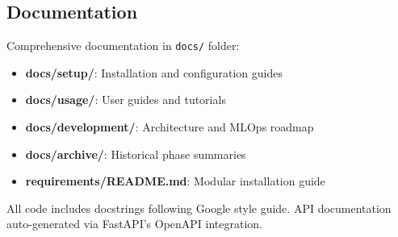 \subsection{Documentation}

Comprehensive documentation in \texttt{docs/} folder:

\begin{itemize}
    \item \textbf{docs/setup/}: Installation and configuration guides
    \item \textbf{docs/usage/}: User guides and tutorials
    \item \textbf{docs/development/}: Architecture and MLOps roadmap
    \item \textbf{docs/archive/}: Historical phase summaries
    \item \textbf{requirements/README.md}: Modular installation guide
\end{itemize}

All code includes docstrings following Google style guide. API documentation auto-generated via FastAPI's OpenAPI integration.
